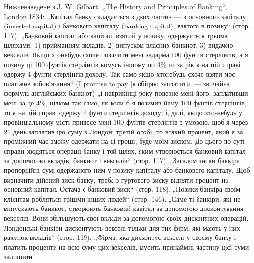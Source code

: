 Нижченаведене з J. W. Gilbart: „The History and Principles of Banking“,
London 1834: „Капітал банку складається з двох частин — з основного капіталу
(invested capital) і банкового капіталу (banking capital), взятого в позику“ (стор. 117).
„Банковий капітал або капітал, взятий у позику, одержується трьома шляхами:
1) прийманням вкладів, 2) випуском власних банкнот, 3) видачею векселів. Якщо
хтонебудь схоче позичити мені задарма 100 фунтів стерлінгів, а я позичу ці
100 фунтів стерлінгів комусь іншому по 4\% то за рік я на цій справі одержу
4 фунти стерлінгів доходу. Так само якщо хтонебудь схоче взяти моє платіжне
зобов’язання“ (I promise to pay [я обіцяю заплатити] — звичайна формула англійських банкнот) „і
наприкінці року поверне мені його, заплативши мені за це 4\%, цілком так само, як коли б я позичив
йому 100 фунтів стерлінгів, то я на цій справі одержу 4 фунти стерлінгів доходу; і, далі, якщо
хто-небудь у провінціальному місті принесе мені 100 фунтів стерлінгів з умовою, щоб я через 21 день
заплатив цю суму в Лондоні третій особі, то всякий процент, який я за проміжний час зможу одержати
на ці гроші, буде моїм зиском. До цього по суті справи зводяться операції банку і той шлях, яким
утворюється банковий капітал за допомогою вкладів, банкнот і векселів“ (стор. 117). „Загалом зиски
банкіра пропорційні сумі одержаного ним у позику капіталу або банкового капіталу. Щоб визначити
дійсний зиск банку, треба з гуртового зиску відняти процент на основний капітал. Остача є банковий
зиск“ (стор. 118). „Позики банкіра своїм клієнтам робляться грішми інших людей“ (стор. 146). „Саме
ті банкіри, які не випускають банкнот, створюють банковий капітал за допомогою дисконтування
векселів. Вони збільшують свої вклади за допомогою своїх дисконтних операцій. Лондонські банкіри
дисконтують векселі тільки для тих фірм, які мають у них рахунок вкладів“ (стор. 119). „Фірма, яка
дисконтує векселі у своєму банку і платить проценти на всю суму цих векселів, мусить принаймні
частину цієї суми залишити
